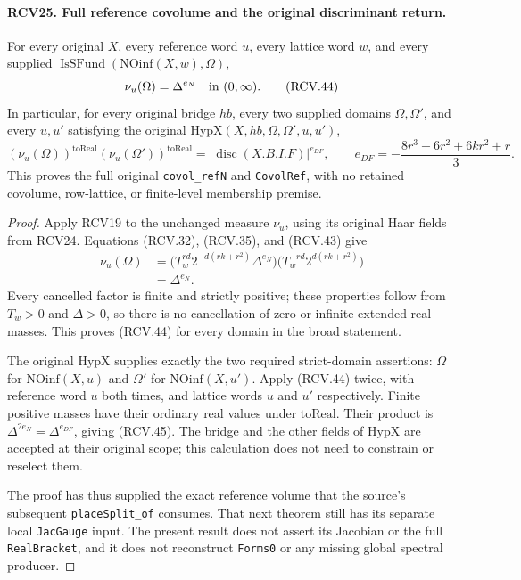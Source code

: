 \paragraph{RCV25. Full reference covolume and the original discriminant return.}
\label{claim:RCV25}
For every original \(X\), every reference word \(u\), every
lattice word \(w\), and every supplied
\(\operatorname{IsSFund}(\mathrm{NOinf}(X,w),\Omega)\),
\[
                  \nu_u(\Omega)=\Delta^{e_N}
                         \quad\hbox{in }(0,\infty).
\tag{RCV.44}
\]
In particular, for every original bridge \(hb\), every two
supplied domains \(\Omega,\Omega'\), and every \(u,u'\)
satisfying the original \(\mathrm{HypX}(X,hb,\Omega,\Omega',u,u')\),
\[
 (\nu_u(\Omega))^{\mathrm{toReal}}
 (\nu_u(\Omega'))^{\mathrm{toReal}}
 =|\operatorname{disc}(X.B.I.F)|^{e_{DF}},\qquad
 e_{DF}=-\frac{8r^3+6r^2+6kr^2+r}{3}.
\tag{RCV.45}
\]
This proves the full original \texttt{covol\_refN} and
\texttt{CovolRef}, with no retained covolume, row-lattice, or
finite-level membership premise.
\begin{proof}
Apply RCV19 to the unchanged measure \(\nu_u\), using its
original Haar fields from RCV24.  Equations (RCV.32), (RCV.35),
and (RCV.43) give
\[
 \begin{split}
 \nu_u(\Omega)
 &=\big(T_w^{rd}2^{-d(rk+r^2)}\Delta^{e_N}\big)
                       \big(T_w^{-rd}2^{d(rk+r^2)}\big)\\
 &=\Delta^{e_N}.
 \end{split}
\]
Every cancelled factor is finite and strictly positive; these
properties follow from \(T_w>0\) and \(\Delta>0\), so there
is no cancellation of zero or infinite extended-real masses.
This proves (RCV.44) for every domain in the broad statement.

The original \(\mathrm{HypX}\) supplies exactly the two required
strict-domain assertions: \(\Omega\) for
\(\mathrm{NOinf}(X,u)\) and \(\Omega'\) for
\(\mathrm{NOinf}(X,u')\).  Apply (RCV.44) twice, with reference
word \(u\) both times, and lattice words \(u\) and \(u'\)
respectively.  Finite positive masses have their ordinary real values
under \(\mathrm{toReal}\).  Their product is
\(\Delta^{2e_N}=\Delta^{e_{DF}}\), giving (RCV.45).
The bridge and the other fields of \(\mathrm{HypX}\) are accepted
at their original scope; this calculation does not need to constrain
or reselect them.

The proof has thus supplied the exact reference volume that the
source's subsequent \texttt{placeSplit\_of} consumes.  That next
theorem still has its separate local \texttt{JacGauge} input.
The present result does not assert its Jacobian or the full
\texttt{RealBracket}, and it does not reconstruct \texttt{Forms0}
or any missing global spectral producer.
\end{proof}


